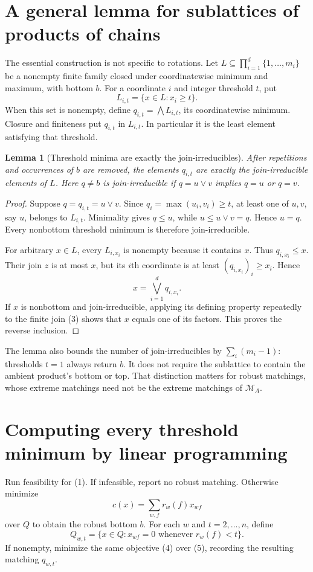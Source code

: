 \documentclass[11pt,a4paper]{article}
\newtheorem{lemma}[theorem]{Lemma}
\begin{document}
\section{A general lemma for sublattices of products of chains}
The essential construction is not specific to rotations. Let
$L\subseteq\prod_{i=1}^d\{1,\ldots,m_i\}$ be a nonempty finite family closed under coordinatewise minimum and maximum, with bottom $b$. For a coordinate $i$ and integer threshold $t$, put
\[
 L_{i,t}=\{x\in L:x_i\ge t\}.
\]
When this set is nonempty, define $q_{i,t}=\bigwedge L_{i,t}$, its coordinatewise minimum. Closure and finiteness put $q_{i,t}$ in $L_{i,t}$. In particular it is the least element satisfying that threshold.

\begin{lemma}[Threshold minima are exactly the join-irreducibles]
After repetitions and occurrences of $b$ are removed, the elements $q_{i,t}$ are exactly the join-irreducible elements of $L$. Here $q\ne b$ is join-irreducible if $q=u\vee v$ implies $q=u$ or $q=v$.
\end{lemma}
\begin{proof}
Suppose $q=q_{i,t}=u\vee v$. Since $q_i=\max(u_i,v_i)\ge t$, at least one of $u,v$, say $u$, belongs to $L_{i,t}$. Minimality gives $q\le u$, while $u\le u\vee v=q$. Hence $u=q$. Every nonbottom threshold minimum is therefore join-irreducible.

For arbitrary $x\in L$, every $L_{i,x_i}$ is nonempty because it contains $x$. Thus $q_{i,x_i}\le x$. Their join $z$ is at most $x$, but its $i$th coordinate is at least $(q_{i,x_i})_i\ge x_i$. Hence
\[
 x=\bigvee_{i=1}^d q_{i,x_i}.                              \tag{3}
\]
If $x$ is nonbottom and join-irreducible, applying its defining property repeatedly to the finite join (3) shows that $x$ equals one of its factors. This proves the reverse inclusion.
\end{proof}

The lemma also bounds the number of join-irreducibles by
$\sum_i(m_i-1)$: thresholds $t=1$ always return $b$. It does not require the sublattice to contain the ambient product's bottom or top. That distinction matters for robust matchings, whose extreme matchings need not be the extreme matchings of $\mathcal M_A$.

\section{Computing every threshold minimum by linear programming}
Run feasibility for (1). If infeasible, report no robust matching. Otherwise minimize
\[
 c(x)=\sum_{w,f}r_w(f)x_{wf}                               \tag{4}
\]
over $Q$ to obtain the robust bottom $b$. For each $w$ and $t=2,\ldots,n$, define
\[
 Q_{w,t}=\{x\in Q:x_{wf}=0\text{ whenever }r_w(f)<t\}.      \tag{5}
\]
If nonempty, minimize the same objective (4) over (5), recording the resulting matching $q_{w,t}$.
\end{document}
